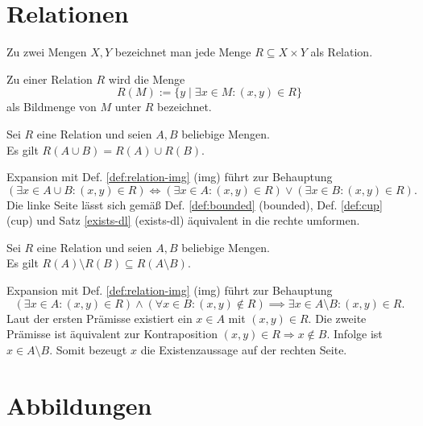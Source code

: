 \section{Relationen}
\begin{Definition}\newlinefirst
Zu zwei Mengen $X,Y$ bezeichnet man
jede Menge $R\subseteq X\times Y$ als Relation.
\end{Definition}
\begin{Definition}\label{def:relation-img}
Zu einer Relation $R$ wird die Menge
\[R(M) := \{y\mid\exists x\in M\colon (x,y)\in R\}\]
als Bildmenge von $M$ unter $R$ bezeichnet.
\end{Definition}

\begin{Korollar}
Sei $R$ eine Relation und seien $A,B$ beliebige Mengen.\\
Es gilt $R(A\cup B) = R(A)\cup R(B)$.
\end{Korollar}
\begin{Beweis}
Expansion mit Def. \ref{def:relation-img} (img) führt zur Behauptung
\[(\exists x\in A\cup B\colon (x,y)\in R) \iff (\exists x\in A\colon (x,y)\in R)
\lor (\exists x\in B\colon (x,y)\in R).\]
Die linke Seite lässt sich gemäß Def. \ref{def:bounded} (bounded),
Def. \ref{def:cup} (cup) und Satz \ref{exists-dl} (exists-dl)
äquivalent in die rechte umformen.\;\qedsymbol
\end{Beweis}

\begin{Korollar}
Sei $R$ eine Relation und seien $A,B$ beliebige Mengen.\\
Es gilt $R(A)\setminus R(B)\subseteq R(A\setminus B)$.
\end{Korollar}
\begin{Beweis}
Expansion mit Def. \ref{def:relation-img} (img) führt zur Behauptung
\[(\exists x\in A\colon (x,y)\in R)\land (\forall x\in B\colon (x,y)\notin R)
\implies \exists x\in A\setminus B\colon (x,y)\in R.\]
Laut der ersten Prämisse existiert ein $x\in A$ mit $(x,y)\in R$. Die
zweite Prämisse ist äquivalent zur Kontraposition $(x,y)\in R\Rightarrow x\notin B$.
Infolge ist $x\in A\setminus B$. Somit bezeugt $x$ die
Existenzaussage auf der rechten Seite.\,\qedsymbol
\end{Beweis}

\newpage
\section{Abbildungen}
